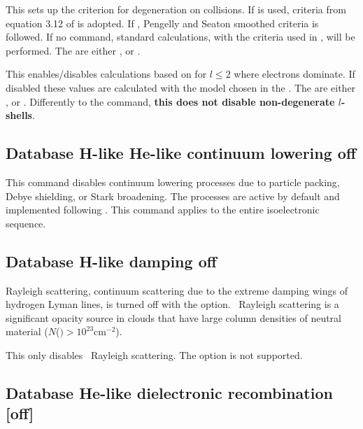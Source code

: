 This sets up the criterion for degeneration on collisions. If  is used, 
criteria from equation 3.12 of \citet{1972MNRAS.157..211B} is adopted. 
If , Pengelly and Seaton \cite{PengellySeaton1964} smoothed 
criteria is followed. If no command, standard calculations, with the criteria used in \citet{Guzman.II.2017}, 
will be performed. The  are either , 
 or .

This enables/disables calculations based on \citet{Seaton1962} for $l\leq 2$ where electrons dominate. 
If disabled these values are calculated with the model chosen in the . 
The  are either ,  or . 
Differently to the  command, {\bf this does not disable non-degenerate $l$-shells}.

\subsection{Database H-like \OR{} He-like  continuum lowering off }
This command disables continuum lowering processes due to particle packing,
Debye shielding, or Stark broadening.  The processes are active by default
and implemented following \citet{Bautista00}.  This command applies
to the entire isoelectronic sequence.

\subsection{Database H-like damping off}

Rayleigh scattering, continuum scattering due to the extreme damping
wings of hydrogen Lyman lines, is turned off with the  option.
\hi\  Rayleigh scattering is a significant opacity source in clouds that have
large column densities of neutral material
($N$(\hO $) > 10^{23} \mathrm{cm}^{-2}$).

This only disables \hi\ Rayleigh scattering.  
The  option is not supported. 

\subsection{Database He-like dielectronic recombination [off] }

